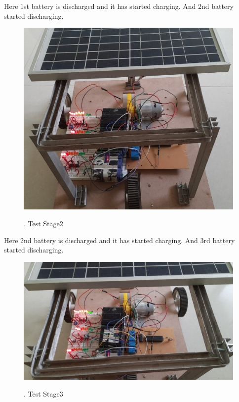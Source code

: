 \documentclass[a4paper,12pt]{article}
\begin{document}
Here 1st battery is discharged and it has started charging. And 2nd battery started discharging.\\

\begin{figure}[!h]
\centering
\includegraphics[scale=0.25]{hw3.jpeg}\\
\caption{. Test Stage2}
\end{figure}

Here 2nd battery is discharged and it has started charging. And 3rd battery started discharging.\\

\newpage
\begin{figure}[!h]
\centering
\includegraphics[scale=0.3]{hw4.jpeg}\\
\caption{. Test Stage3}
\end{figure}
\end{document}
